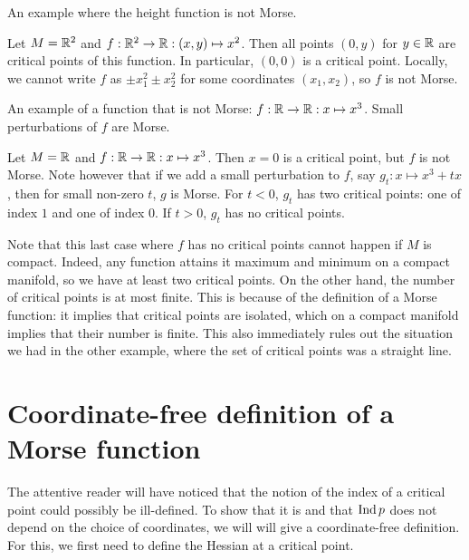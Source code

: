 \begin{marginfigure}
    \centering
    \caption{An example where the height function is not Morse.}
    \label{fig:non-example-of-morse-function}
\end{marginfigure}
\begin{noneg}
    Let $M = \mathbb{R}^2$ and $f: \mathbb{R}^2 \to  \mathbb{R}: (x, y) \mapsto  x^2$.
    Then all points $(0, y)$ for  $y \in \mathbb{R}$ are critical points of this function.
    In particular, $(0, 0)$ is a critical point. Locally, we cannot write $f$ as  $ \pm x_1^2 \pm x_2^2$ for some coordinates $(x_1, x_2)$, so $f$ is not Morse.
\end{noneg}
\begin{marginfigure}
    \centering
    \caption{An example of a function that is not Morse: $f: \mathbb{R} \to  \mathbb{R}: x \mapsto  x^3$.
        Small perturbations of $f$ are Morse.
    }
    \label{fig:non-examples-of-morse-functions}
\end{marginfigure}
\begin{noneg}
    Let $M = \mathbb{R}$ and $f : \mathbb{R} \to  \mathbb{R}: x \mapsto x^3$.
    Then $x = 0$ is a critical point, but $f$ is not Morse.
    Note however that if we add a small perturbation to $f$, say $g_t: x\mapsto x^3+ tx$, then for small non-zero $t$, $g$ is Morse. For $t < 0$, $g_t$  has two critical points: one of index $1$ and one of index $0$.
    If $t > 0$,  $g_t$ has no critical points.
\end{noneg}

Note that this last case where $f$ has no critical points cannot happen if $M$ is compact.
Indeed, any function attains it maximum and minimum on a compact manifold, so we have at least two critical points.
On the other hand, the number of critical points is at most finite.
This is because of the definition of a Morse function: it implies that critical points are isolated, which on a compact manifold implies that their number is finite.
This also immediately rules out the situation we had in the other example, where the set of critical points was a straight line.

\section{Coordinate-free definition of a Morse function}

The attentive reader will have noticed that the notion of the index of a critical point could possibly be ill-defined.
To show that it is and that $\operatorname{Ind} p$ does not depend on the choice of coordinates, we will will give a coordinate-free definition. For this, we first need to define the Hessian at a critical point.

